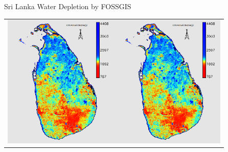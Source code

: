 \documentclass[xcolor=dvipsnames,beamer]{beamer} %
\begin{document}
\begin{frame}[fragile]{Sri Lanka Water Depletion by FOSSGIS}

\begin{center}
\begin{tabular}{l}
\includegraphics[width=5.5cm]{slet2005}\includegraphics[width=5.5cm]{slet2005}
\end{tabular}
\end{center}

\end{frame}
\end{document}
